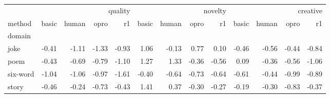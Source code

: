 \begin{tabular}{lrrrrrrrrrrrr}
\toprule
 & \multicolumn{4}{r}{quality} & \multicolumn{4}{r}{novelty} & \multicolumn{4}{r}{creative} \\
method & basic & human & opro & r1 & basic & human & opro & r1 & basic & human & opro & r1 \\
domain &  &  &  &  &  &  &  &  &  &  &  &  \\
\midrule
joke & -0.41 & -1.11 & -1.33 & -0.93 & 1.06 & -0.13 & 0.77 & 0.10 & -0.46 & -0.56 & -0.44 & -0.84 \\
poem & -0.43 & -0.69 & -0.79 & -1.10 & 1.27 & 1.33 & -0.36 & -0.56 & 0.09 & -0.36 & -0.56 & -1.06 \\
six-word & -1.04 & -1.06 & -0.97 & -1.61 & -0.40 & -0.64 & -0.73 & -0.64 & -0.61 & -0.44 & -0.99 & -0.89 \\
story & -0.46 & -0.24 & -0.73 & -0.43 & 1.41 & 0.37 & -0.30 & -0.27 & -0.19 & -0.30 & -0.83 & -0.37 \\
\bottomrule
\end{tabular}
